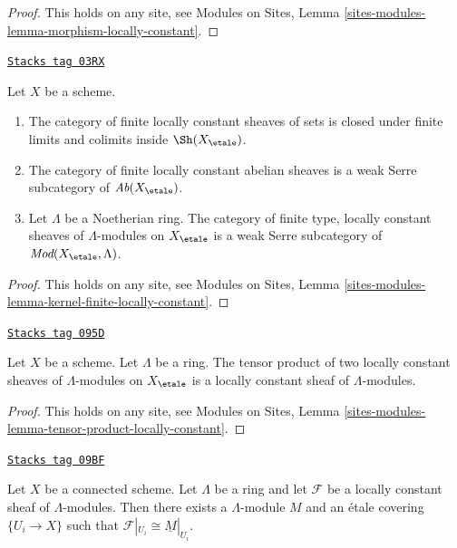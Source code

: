 \begin{proof}
This holds on any site, see
Modules on Sites, Lemma \ref{sites-modules-lemma-morphism-locally-constant}.
\end{proof}

\begin{lemma}
\label{etale-cohomology-lemma-kernel-finite-locally-constant}
\href{https://stacks.math.columbia.edu/tag/03RX}{\texttt{Stacks tag 03RX}}

Let $X$ be a scheme.
\begin{enumerate}
\item The category of finite locally constant sheaves of sets
is closed under finite limits and colimits inside $\Sh(X_\etale)$.
\item The category of finite locally constant abelian sheaves is a
weak Serre subcategory of $\textit{Ab}(X_\etale)$.
\item Let $\Lambda$ be a Noetherian ring. The category of
finite type, locally constant sheaves of $\Lambda$-modules on
$X_\etale$ is a weak Serre subcategory of
$\textit{Mod}(X_\etale, \Lambda)$.
\end{enumerate}
\end{lemma}

\begin{proof}
This holds on any site, see
Modules on Sites, Lemma
\ref{sites-modules-lemma-kernel-finite-locally-constant}.
\end{proof}

\begin{lemma}
\label{etale-cohomology-lemma-tensor-product-locally-constant}
\href{https://stacks.math.columbia.edu/tag/095D}{\texttt{Stacks tag 095D}}

Let $X$ be a scheme. Let $\Lambda$ be a ring.
The tensor product of two locally constant sheaves of $\Lambda$-modules
on $X_\etale$ is a locally constant sheaf of $\Lambda$-modules.
\end{lemma}

\begin{proof}
This holds on any site, see
Modules on Sites, Lemma
\ref{sites-modules-lemma-tensor-product-locally-constant}.
\end{proof}

\begin{lemma}
\label{etale-cohomology-lemma-connected-locally-constant}
\href{https://stacks.math.columbia.edu/tag/09BF}{\texttt{Stacks tag 09BF}}

Let $X$ be a connected scheme. Let $\Lambda$ be a ring and let
$\mathcal{F}$ be a locally constant sheaf of $\Lambda$-modules.
Then there exists a $\Lambda$-module $M$ and an \'etale covering
$\{U_i \to X\}$ such that $\mathcal{F}|_{U_i} \cong \underline{M}|_{U_i}$.
\end{lemma}

